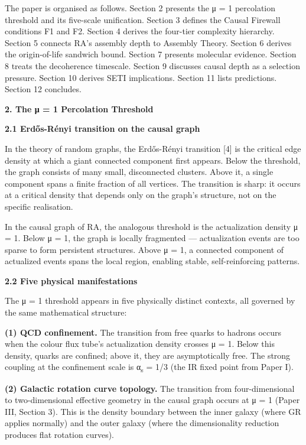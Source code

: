 \documentclass[12pt,a4paper]{article}
\begin{document}
The paper is organised as follows. Section 2 presents the μ = 1
percolation threshold and its five-scale unification. Section 3 defines
the Causal Firewall conditions F1 and F2. Section 4 derives the
four-tier complexity hierarchy. Section 5 connects RA's assembly depth
to Assembly Theory. Section 6 derives the origin-of-life sandwich bound.
Section 7 presents molecular evidence. Section 8 treats the decoherence
timescale. Section 9 discusses causal depth as a selection pressure.
Section 10 derives SETI implications. Section 11 lists predictions.
Section 12 concludes.

\textbf{2. The μ = 1 Percolation Threshold}

\textbf{2.1 Erdős-Rényi transition on the causal graph}

In the theory of random graphs, the Erdős-Rényi transition {[}4{]} is
the critical edge density at which a giant connected component first
appears. Below the threshold, the graph consists of many small,
disconnected clusters. Above it, a single component spans a finite
fraction of all vertices. The transition is sharp: it occurs at a
critical density that depends only on the graph's structure, not on the
specific realisation.

In the causal graph of RA, the analogous threshold is the actualization
density μ = 1. Below μ = 1, the graph is locally fragmented ---
actualization events are too sparse to form persistent structures. Above
μ = 1, a connected component of actualized events spans the local
region, enabling stable, self-reinforcing patterns.

\textbf{2.2 Five physical manifestations}

The μ = 1 threshold appears in five physically distinct contexts, all
governed by the same mathematical structure:

\textbf{(1) QCD confinement.} The transition from free quarks to hadrons
occurs when the colour flux tube's actualization density crosses μ = 1.
Below this density, quarks are confined; above it, they are
asymptotically free. The strong coupling at the confinement scale is
α\textsubscript{s} = 1/3 (the IR fixed point from Paper I).

\textbf{(2) Galactic rotation curve topology.} The transition from
four-dimensional to two-dimensional effective geometry in the causal
graph occurs at μ = 1 (Paper III, Section 3). This is the density
boundary between the inner galaxy (where GR applies normally) and the
outer galaxy (where the dimensionality reduction produces flat rotation
curves).
\end{document}
